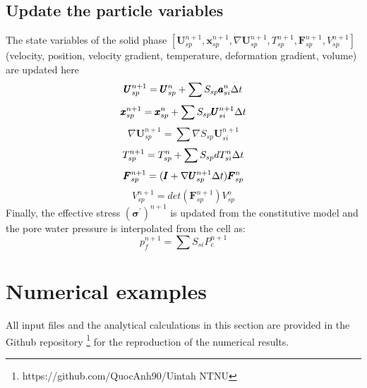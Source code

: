 \documentclass[preprint,12pt]{elsarticle}
\begin{document}
\subsection{\textsf{Update the particle variables}}
%
%
The state variables of the solid phase $[\pmb{U}_{sp}^{n+1},\pmb{x}_{sp}^{n+1},\nabla \pmb{U}_{sp}^{n+1}, T_{sp}^{n+1}, \pmb{F}_{sp}^{n+1},V_{sp}^{n+1}]$ (velocity, position, velocity gradient, temperature, deformation gradient, volume) are updated here 
%
%
\begin{equation}
     \pmb{U}_{sp}^{n+1} = \pmb{U}_{sp}^n + \sum{S_{sp} \pmb{a}_{si}^n \ensuremath{\Delta{t}} } 
\end {equation}
%
%
\begin{equation}
     \pmb{x}_{sp}^{n+1} = \pmb{x}_{sp}^n + \sum{S_{sp} \pmb{U}_{si}^{n+1} \ensuremath{\Delta{t}} } 
\end {equation}
%
%
\begin{equation}
    \nabla \pmb{U}_{sp}^{n+1} = \sum{\nabla S_{sp} \pmb{U}_{si}^{n+1}} 
\end {equation}
%
%
\begin{equation}
     T_{sp}^{n+1} = T_{sp}^n + \sum{S_{sp} dT_{si}^n \ensuremath{\Delta{t}} } 
\end {equation}
%
%
\begin{equation}
     \pmb{F}_{sp}^{n+1} = (\pmb{I} + \nabla \pmb{U}_{sp}^{n+1} \Delta{t})\pmb{F}_{sp}^n
\end {equation}
%
%
\begin{equation}
     V_{sp}^{n+1} = det(\pmb{F}_{sp}^{n+1}) V_{sp}^o
\end {equation}
%
%
Finally, the effective stress $(\pmb{\sigma}^\prime)^{n+1}$ is updated from the constitutive model and the pore water pressure is interpolated from the cell as:
%
%
\begin{equation}
     p_{f}^{n+1} = \sum{S_{si} P_{c}^{n+1}} 
\end {equation}
%
%
\section{\textsf{Numerical examples}}
All input files and the analytical calculations in this section are provided in the Github repository \footnote{https://github.com/QuocAnh90/Uintah NTNU} for the reproduction of the numerical results.\\
\end{document}
